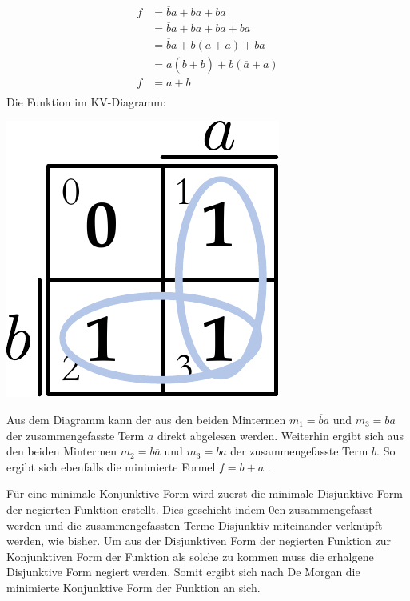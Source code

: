 \documentclass[11pt,a4paper]{scrreprt}
\begin{document}
\begin{itemize}
		\begin{align*}
			f &= \overline{b}a + b\overline{a} + ba  \\
			  &= \overline{b}a + b\overline{a} + ba + ba \\
			  &= \overline{b}a + b(\overline{a} + a) + ba \\
			  &= a(\overline{b} + b) + b(\overline{a} + a) \\
			f &= a + b \\
		\end{align*}
		Die Funktion im KV-Diagramm:
		\begin{center}
			{\includegraphics[scale = 0.5]{KV2diagramm_belegt2.pdf}}
		\end{center}
		Aus dem Diagramm kann der aus den beiden Mintermen $m_1 = \overline{b}{a}$ und $m_3 = ba$ der zusammengefasste Term $a$ direkt abgelesen werden. Weiterhin ergibt sich aus den beiden Mintermen $m_2 = {b}\overline{a}$ und $m_3 = ba$ der zusammengefasste Term $b$. So ergibt sich ebenfalls die minimierte Formel $f = b + a$ .
\end{itemize}


Für eine minimale Konjunktive Form wird zuerst die minimale Disjunktive Form der negierten Funktion erstellt. Dies geschieht indem 0en zusammengefasst werden und die zusammengefassten Terme Disjunktiv miteinander verknüpft werden, wie bisher. Um aus der Disjunktiven Form der negierten Funktion zur Konjunktiven Form der Funktion als solche zu kommen muss die erhalgene Disjunktive Form negiert werden. Somit ergibt sich nach De Morgan die minimierte Konjunktive Form der Funktion an sich.
\end{document}
